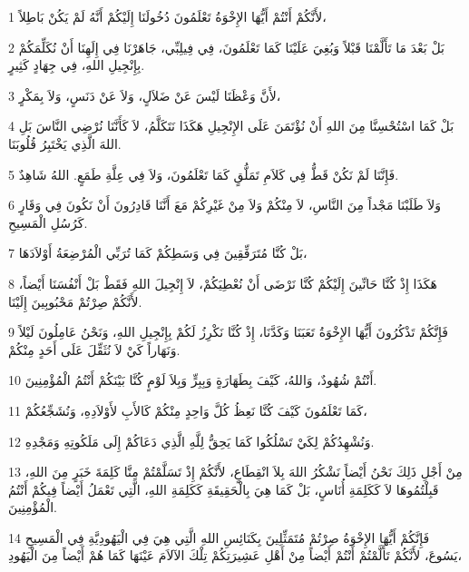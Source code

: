 \par 1 لأَنَّكُمْ أَنْتُمْ أَيُّهَا الإِخْوَةُ تَعْلَمُونَ دُخُولَنَا إِلَيْكُمْ أَنَّهُ لَمْ يَكُنْ بَاطِلاً،
\par 2 بَلْ بَعْدَ مَا تَأَلَّمْنَا قَبْلاً وَبُغِيَ عَلَيْنَا كَمَا تَعْلَمُونَ، فِي فِيلِبِّي، جَاهَرْنَا فِي إِلَهِنَا أَنْ نُكَلِّمَكُمْ بِإِنْجِيلِ اللهِ، فِي جِهَادٍ كَثِيرٍ.
\par 3 لأَنَّ وَعْظَنَا لَيْسَ عَنْ ضَلاَلٍ، وَلاَ عَنْ دَنَسٍ، وَلاَ بِمَكْرٍ،
\par 4 بَلْ كَمَا اسْتُحْسِنَّا مِنَ اللهِ أَنْ نُؤْتَمَنَ عَلَى الإِنْجِيلِ هَكَذَا نَتَكَلَّمُ، لاَ كَأَنَّنَا نُرْضِي النَّاسَ بَلِ اللهَ الَّذِي يَخْتَبِرُ قُلُوبَنَا.
\par 5 فَإِنَّنَا لَمْ نَكُنْ قَطُّ فِي كَلاَمِ تَمَلُّقٍ كَمَا تَعْلَمُونَ، وَلاَ فِي عِلَّةِ طَمَعٍ. اللهُ شَاهِدٌ.
\par 6 وَلاَ طَلَبْنَا مَجْداً مِنَ النَّاسِ، لاَ مِنْكُمْ وَلاَ مِنْ غَيْرِكُمْ مَعَ أَنَّنَا قَادِرُونَ أَنْ نَكُونَ فِي وَقَارٍ كَرُسُلِ الْمَسِيحِ.
\par 7 بَلْ كُنَّا مُتَرَفِّقِينَ فِي وَسَطِكُمْ كَمَا تُرَبِّي الْمُرْضِعَةُ أَوْلاَدَهَا،
\par 8 هَكَذَا إِذْ كُنَّا حَانِّينَ إِلَيْكُمْ كُنَّا نَرْضَى أَنْ نُعْطِيَكُمْ، لاَ إِنْجِيلَ اللهِ فَقَطْ بَلْ أَنْفُسَنَا أَيْضاً، لأَنَّكُمْ صِرْتُمْ مَحْبُوبِينَ إِلَيْنَا.
\par 9 فَإِنَّكُمْ تَذْكُرُونَ أَيُّهَا الإِخْوَةُ تَعَبَنَا وَكَدَّنَا، إِذْ كُنَّا نَكْرِزُ لَكُمْ بِإِنْجِيلِ اللهِ، وَنَحْنُ عَامِلُونَ لَيْلاً وَنَهَاراً كَيْ لاَ نُثَقِّلَ عَلَى أَحَدٍ مِنْكُمْ.
\par 10 أَنْتُمْ شُهُودٌ، وَاللهُ، كَيْفَ بِطَهَارَةٍ وَبِبِرٍّ وَبِلاَ لَوْمٍ كُنَّا بَيْنَكُمْ أَنْتُمُ الْمُؤْمِنِينَ.
\par 11 كَمَا تَعْلَمُونَ كَيْفَ كُنَّا نَعِظُ كُلَّ وَاحِدٍ مِنْكُمْ كَالأَبِ لأَوْلاَدِهِ، وَنُشَجِّعُكُمْ،
\par 12 وَنُشْهِدُكُمْ لِكَيْ تَسْلُكُوا كَمَا يَحِقُّ لِلَّهِ الَّذِي دَعَاكُمْ إِلَى مَلَكُوتِهِ وَمَجْدِهِ.
\par 13 مِنْ أَجْلِ ذَلِكَ نَحْنُ أَيْضاً نَشْكُرُ اللهَ بِلاَ انْقِطَاعٍ، لأَنَّكُمْ إِذْ تَسَلَّمْتُمْ مِنَّا كَلِمَةَ خَبَرٍ مِنَ اللهِ، قَبِلْتُمُوهَا لاَ كَكَلِمَةِ أُنَاسٍ، بَلْ كَمَا هِيَ بِالْحَقِيقَةِ كَكَلِمَةِ اللهِ، الَّتِي تَعْمَلُ أَيْضاً فِيكُمْ أَنْتُمُ الْمُؤْمِنِينَ.
\par 14 فَإِنَّكُمْ أَيُّهَا الإِخْوَةُ صِرْتُمْ مُتَمَثِّلِينَ بِكَنَائِسِ اللهِ الَّتِي هِيَ فِي الْيَهُودِيَّةِ فِي الْمَسِيحِ يَسُوعَ، لأَنَّكُمْ تَأَلَّمْتُمْ أَنْتُمْ أَيْضاً مِنْ أَهْلِ عَشِيرَتِكُمْ تِلْكَ الآلاَمَ عَيْنَهَا كَمَا هُمْ أَيْضاً مِنَ الْيَهُودِ،
